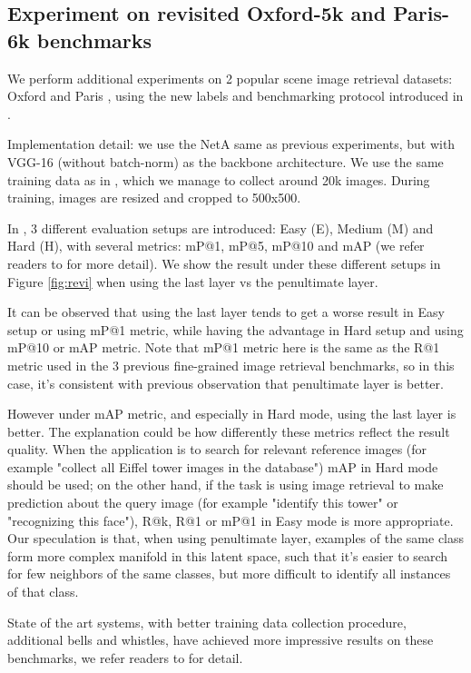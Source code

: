 \documentclass[10pt,twocolumn,letterpaper]{article}
\begin{document}
\subsection{Experiment on revisited Oxford-5k and Paris-6k benchmarks}

We perform additional experiments on 2 popular scene image retrieval datasets: Oxford \cite{Philbin07} and Paris \cite{Philbin08}, using the new labels and benchmarking protocol introduced in \cite{Radenovic-CVPR18}.

Implementation detail: we use the NetA same as previous experiments, but with VGG-16 (without batch-norm) as the backbone architecture. We use the same training data as in \cite{gordo2016deep}, which we manage to collect around 20k images. During training, images are resized and cropped to 500x500.


In \cite{Radenovic-CVPR18}, 3 different evaluation setups are introduced: Easy (E), Medium (M) and Hard (H), with several metrics: mP@1, mP@5, mP@10 and mAP (we refer readers to \cite{Radenovic-CVPR18} for more detail). We show the result under these different setups in Figure \ref{fig:revi} when using the last layer vs the penultimate layer.

It can be observed that using the last layer tends to get a worse result in Easy setup or using mP@1 metric, while having the advantage in Hard setup and using mP@10 or mAP metric. Note that mP@1 metric here is the same as the R@1 metric used in the 3 previous fine-grained image retrieval benchmarks, so in this case, it's consistent with previous observation that penultimate layer is better.

However under mAP metric, and especially in Hard mode, using the last layer is better. The explanation could be how differently these metrics reflect the result quality. When the application is to search for relevant reference images (for example "collect all Eiffel tower images in the database") mAP in Hard mode should be used; on the other hand, if the task is using image retrieval to make prediction about the query image (for example "identify this tower" or "recognizing this face"), R@k, R@1 or mP@1 in Easy mode is more appropriate. Our speculation is that, when using penultimate layer, examples of the same class form more complex manifold in this latent space, such that it's easier to search for few neighbors of the same classes, but more difficult to identify all instances of that class.

State of the art systems, with better training data collection procedure, additional bells and whistles, have achieved more impressive results on these benchmarks, we refer readers to \cite{Radenovic-CVPR18} for detail. 
\end{document}
